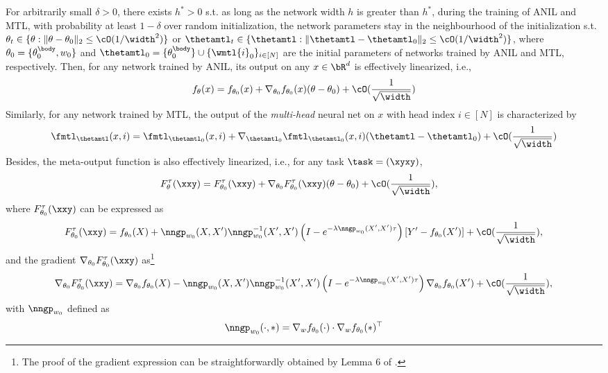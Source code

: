 \documentclass{article}
\begin{document}
\begin{corollary}\label{corollary:linearization}
For arbitrarily small $\delta > 0$, there exists $h^* >0$ s.t. as long as the network width $h$ is greater than $h^*$, during the training of ANIL and MTL, with probability at least $1-\delta$ over random initialization, the network parameters stay in the neighbourhood of the initialization s.t. $\theta_t \in \{\theta: \|\theta - \theta_0\|_2 \leq \cO(1/\width^2) \}$ or $\thetamtl_t \in \{\thetamtl: \|\thetamtl - \thetamtl_0\|_2 \leq \cO(1/\width^2) \}$, where $\theta_0 = \{\theta_0^\body,w_0\}$ and $\thetamtl_0 = \{\theta_0^\body\}\cup \{\wmtl{i}_0\}_{i\in[N]}$ are the initial parameters of networks trained by ANIL and MTL, respectively. Then, for any network trained by ANIL, its output on any $x\in \bR^d$ is effectively linearized, i.e.,
    \begin{align}\label{eq:linear-output-single-head}
        f_\theta(x) = f_{\theta_0}(x) + \nabla_{\theta_0}f_{\theta_0} (x) (\theta - \theta_0) + \cO(\frac{1}{\sqrt{\width}})
    \end{align}
Similarly, for any network trained by MTL, the output of the \textit{multi-head} neural net on $x$ with head index $i\in[N]$ is characterized by
    \begin{align}\label{eq:linear-output-mtl}
        \fmtl_\thetamtl(x,i) = \fmtl_{\thetamtl_0}(x,i) + \nabla_{\thetamtl_0}\fmtl_{\thetamtl_0} (x,i) (\thetamtl - \thetamtl_0) + \cO(\frac{1}{\sqrt{\width}})
    \end{align}
Besides, the meta-output function is also effectively linearized, i.e., for any task $\task = (\xyxy)$,
    \begin{align}\label{eq:linear-output-anil}
        F^\tau_{\theta}(\xxy) &= F^\tau_{\theta_0}(\xxy) + \nabla_{\theta_0} F^\tau_{\theta_0}(\xxy) (\theta - \theta_0) + \cO(\frac{1}{\sqrt{\width}}),
    \end{align}
where $F^\tau_{\theta_0}(\xxy)$ can be expressed as
    \begin{align}\label{eq:F_0}
        F^\tau_{\theta_0}(\xxy) = f_{\theta_0}(X) + \nngp_{w_0}(X,X')\nngp_{w_0}^{-1}(X',X') \left(I - e^{-\lambda \nngp_{w_0}(X',X')\tau}\right)\left[Y' - f_{\theta_0}(X')\right] + \cO(\frac{1}{\sqrt{\width}}),
    \end{align}
and the gradient $\nabla_{\theta_0}F^\tau_{\theta_0}(\xxy)$ as\footnote{The proof of the gradient expression can be straightforwardly obtained by Lemma 6 of \cite{meta-ntk}.}
    \begin{align}\label{eq:F_0-grad}
        \nabla_{\theta_0}F^\tau_{\theta_0}(\xxy) = \nabla_{\theta_0}f_{\theta_0}(X) - \nngp_{w_0}(X,X')\nngp_{w_0}^{-1}(X',X') \left(I - e^{-\lambda \nngp_{w_0}(X',X')\tau}\right) \nabla_{\theta_0}f_{\theta_0}(X') + \cO(\frac{1}{\sqrt{\width}}),
    \end{align}
    with $\nngp_{w_0}$ defined as 
    \begin{align*}
        \nngp_{w_0}(\cdot,\ast) = \nabla_{w} f_{\theta_0}(\cdot) \cdot\nabla_{w} f_{\theta_0}(\ast)^\top
    \end{align*}
\end{corollary}
\end{document}
